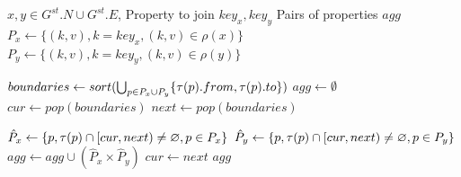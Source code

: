 \begin{algorithm}[t]
\footnotesize
\caption{Temporal property join}
\label{alg:tempjoin}
\begin{algorithmic}[1]
\Require $x,y \in G^{st}.N \cup G^{st}.E$, Property to join $key_x,key_y$
\Ensure Pairs of properties $agg$
\State $P_x \gets \{(k,v),k=key_x, (k,v) \in \rho(x)\}$  \label{alg:line1} 
\State $P_y \gets \{(k,v),k=key_y, (k,v) \in \rho(y)\}$ \label{alg:line2}
\item[]  
\State $boundaries \gets sort(\bigcup_{p \in P_x \cup P_y} \{\tau(p).from, \tau(p).to \})$ \label{alg:line3}
\State $agg \gets \emptyset$ \label{alg:line4}
\State $cur \gets pop(boundaries)$  \label{alg:line5} 
 \label{alg:line6}
    \State $next \gets pop(boundaries)$  \label{alg:line7}
    \item[]  
    \State $\hat{P}_x \gets \{p, \tau(p) \cap [cur, next) \ne \varnothing, p \in P_x\}$ \label{alg:line8}
    \State $\hat{P}_y \gets \{p, \tau(p) \cap [cur, next) \ne \varnothing, p \in P_y\}$ \label{alg:line9}
    \State $agg \gets agg \cup (\hat{P}_x \times \hat{P}_y)$ \label{alg:line10}
    \State $cur \gets next$ \label{alg:line11}
\EndWhile
\State \Return $agg$ \label{alg:line12}
\end{algorithmic}
\end{algorithm}


